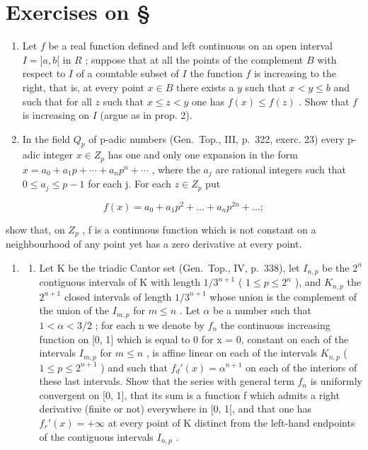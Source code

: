 \section*{Exercises on \S{}}
{}

\begin{enumerate}
\def\labelenumi{\arabic{enumi})}
\item
  Let \(f\) be a real function defined and left continuous on an open interval \(I = ]a, b[\) in \(R\) ; suppose that at all the points of the complement \(B\) with respect to \(I\) of a countable subset of \(I\) the function \(f\) is increasing to the right, that is, at every point \(x \in B\) there exists a \(y\) such that \(x < y \leqslant b\) and such that for all \(z\) such that \(x \leqslant z < y\) one has \(f(x) \leqslant f(z)\) . Show that \(f\) is increasing on \(I\) (argue as in prop. 2).
\item
  In the field \(Q_{p}\) of p-adic numbers (Gen.~Top., III, p.~322, exerc. 23) every p-adic integer \(x \in Z_{p}\) has one and only one expansion in the form \(x = a_{0} + a_{1}p + \cdots + a_{n}p^{n} + \cdots\) , where the \(a_{j}\) are rational integers such that \(0 \leqslant a_{j} \leqslant p - 1\) for each j. For each \(z \in Z_{p}\) put
\end{enumerate}

\[
f (x) = a _ {0} + a _ {1} p ^ {2} + \dots + a _ {n} p ^ {2 n} + \dots ;
\]

show that, on \(Z_{p}\) , f is a continuous function which is not constant on a neighbourhood of any point yet has a zero derivative at every point.

\begin{enumerate}
\def\labelenumi{\arabic{enumi})}
\setcounter{enumi}{2}
\tightlist
\item
  \begin{enumerate}
  \def\labelenumii{\alph{enumii})}
  \tightlist
  \item
    Let K be the triadic Cantor set (Gen.~Top., IV, p.~338), let \(I_{n,p}\) be the \(2^{n}\) contiguous intervals of K with length \(1/3^{n+1}\) ( \(1 \leqslant p \leqslant 2^{n}\) ), and \(K_{n,p}\) the \(2^{n+1}\) closed intervals of length \(1/3^{n+1}\) whose union is the complement of the union of the \(I_{m,p}\) for \(m \leqslant n\) . Let \(\alpha\) be a number such that \(1 < \alpha < 3/2\) ; for each n we denote by \(f_{n}\) the continuous increasing function on {[}0, 1{]} which is equal to 0 for x = 0, constant on each of the intervals \(I_{m,p}\) for \(m \leqslant n\) , is affine linear on each of the intervals \(K_{n,p}\) ( \(1 \leqslant p \leqslant 2^{n+1}\) ) and such that \(f_{d}'(x) = \alpha^{n+1}\) on each of the interiors of these last intervals. Show that the series with general term \(f_{n}\) is uniformly convergent on {[}0, 1{]}, that its sum is a function f which admits a right derivative (finite or not) everywhere in {[}0, 1{[}, and that one has \(f_{r}'(x) = +\infty\) at every point of K distinct from the left-hand endpoints of the contiguous intervals \(I_{n,p}\) .
  \end{enumerate}
\end{enumerate}

